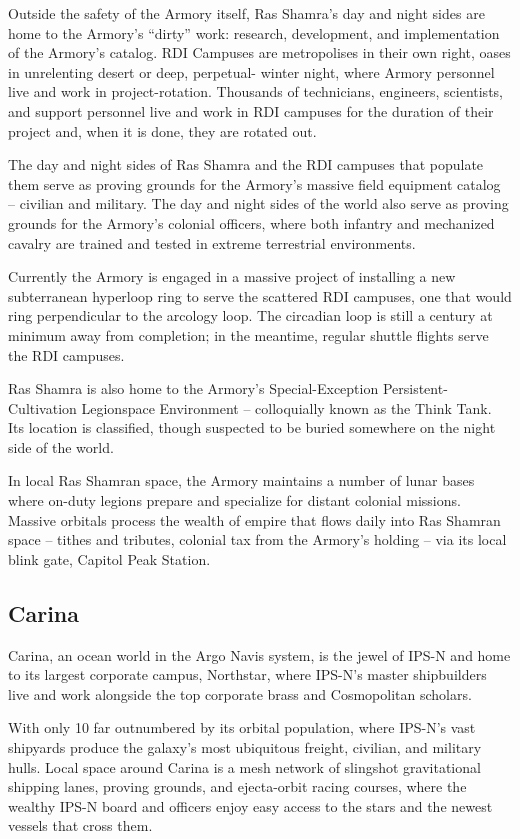 Outside the safety of the Armory itself, Ras Shamra’s day and night sides are home to the
Armory’s “dirty” work: research, development, and implementation of the Armory’s catalog. RDI
Campuses are metropolises in their own right, oases in unrelenting desert or deep, perpetual-
winter night, where Armory personnel live and work in project-rotation. Thousands of technicians,
engineers, scientists, and support personnel live and work in RDI campuses for the duration of
their project and, when it is done, they are rotated out.

The day and night sides of Ras Shamra and the RDI campuses that populate them serve as
proving grounds for the Armory’s massive field equipment catalog -- civilian and military. The day
and night sides of the world also serve as proving grounds for the Armory’s colonial officers,
where both infantry and mechanized cavalry are trained and tested in extreme terrestrial
environments.

Currently the Armory is engaged in a massive project of installing a new subterranean hyperloop
ring to serve the scattered RDI campuses, one that would ring perpendicular to the arcology loop.
The circadian loop is still a century at minimum away from completion; in the meantime, regular
shuttle flights serve the RDI campuses.

Ras Shamra is also home to the Armory’s Special-Exception Persistent-Cultivation Legionspace
Environment -- colloquially known as the Think Tank. Its location is classified, though suspected to
be buried somewhere on the night side of the world.

In local Ras Shamran space, the Armory maintains a number of lunar bases where on-duty
legions prepare and specialize for distant colonial missions. Massive orbitals process the wealth
of empire that flows daily into Ras Shamran space -- tithes and tributes, colonial tax from the
Armory’s holding -- via its local blink gate, Capitol Peak Station.

\subsection{Carina}

Carina, an ocean world in the Argo Navis system, is the jewel of IPS-N and home to its largest
corporate campus, Northstar, where IPS-N’s master shipbuilders live and work alongside the top
corporate brass and Cosmopolitan scholars.

With only 10%
far outnumbered by its orbital population, where IPS-N’s vast shipyards produce the galaxy’s most
ubiquitous freight, civilian, and military hulls. Local space around Carina is a mesh network of
slingshot gravitational shipping lanes, proving grounds, and ejecta-orbit racing courses, where the
wealthy IPS-N board and officers enjoy easy access to the stars and the newest vessels that
cross them.

